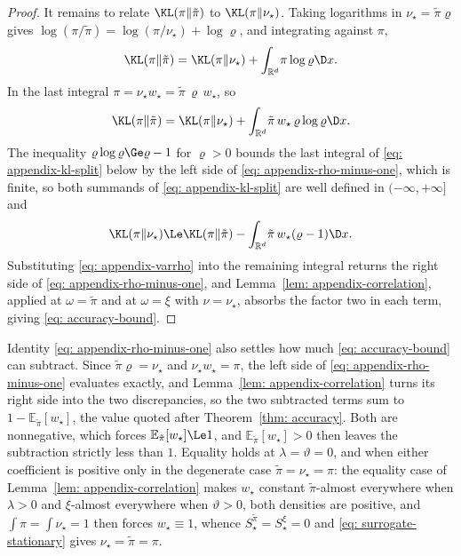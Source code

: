 \documentclass{article}
\begin{document}
\begin{proof}
It remains to relate $\KL(\pi\|\tilde\pi)$ to $\KL(\pi\|\nu_\star)$. Taking logarithms in $\nu_\star=\tilde\pi\varrho$ gives $\log(\pi/\tilde\pi) = \log(\pi/\nu_\star) + \log\varrho$, and integrating against $\pi$,
\begin{equation*}
	\KL(\pi\|\tilde\pi) = \KL(\pi\|\nu_\star) + \int_{\mathbb R^d}\!\pi\log\varrho\D x .
\end{equation*}
In the last integral $\pi = \nu_\star w_\star = \tilde\pi\,\varrho\,w_\star$, so
\begin{equation}
    \KL(\pi\|\tilde\pi) = \KL(\pi\|\nu_\star) + \int_{\mathbb R^d}\!\tilde\pi\,w_\star\,\varrho\log\varrho\D x .
    \label{eq: appendix-kl-split}
\end{equation}
The inequality $\varrho\log\varrho\Ge\varrho-1$ for $\varrho>0$ bounds the last integral of \eqref{eq: appendix-kl-split} below by the left side of \eqref{eq: appendix-rho-minus-one}, which is finite, so both summands of \eqref{eq: appendix-kl-split} are well defined in $(-\infty,+\infty]$ and
\begin{equation*}
    \KL(\pi\|\nu_\star) \Le \KL(\pi\|\tilde\pi) - \int_{\mathbb R^d}\!\tilde\pi\,w_\star(\varrho-1)\D x.
\end{equation*}
Substituting \eqref{eq: appendix-varrho} into the remaining integral returns the right side of \eqref{eq: appendix-rho-minus-one}, and Lemma~\ref{lem: appendix-correlation}, applied at $\omega=\tilde\pi$ and at $\omega=\xi$ with $\nu=\nu_\star$, absorbs the factor two in each term, giving \eqref{eq: accuracy-bound}.
\end{proof}

Identity \eqref{eq: appendix-rho-minus-one} also settles how much \eqref{eq: accuracy-bound} can subtract. Since $\tilde\pi\varrho=\nu_\star$ and $\nu_\star w_\star=\pi$, the left side of \eqref{eq: appendix-rho-minus-one} evaluates exactly, and Lemma~\ref{lem: appendix-correlation} turns its right side into the two discrepancies, so the two subtracted terms sum to $1-\mathbb E_{\tilde\pi}[w_\star]$, the value quoted after Theorem~\ref{thm: accuracy}. Both are nonnegative, which forces $\mathbb E_{\tilde\pi}[w_\star]\Le1$, and $\mathbb E_{\tilde\pi}[w_\star]>0$ then leaves the subtraction strictly less than $1$. Equality holds at $\lambda=\vartheta=0$, and when either coefficient is positive only in the degenerate case $\tilde\pi=\nu_\star=\pi$: the equality case of Lemma~\ref{lem: appendix-correlation} makes $w_\star$ constant $\tilde\pi$-almost everywhere when $\lambda>0$ and $\xi$-almost everywhere when $\vartheta>0$, both densities are positive, and $\int\pi=\int\nu_\star=1$ then forces $w_\star\equiv1$, whence $S^{\tilde\pi}_\star=S^{\xi}_\star=0$ and \eqref{eq: surrogate-stationary} gives $\nu_\star=\tilde\pi=\pi$.
\end{document}
